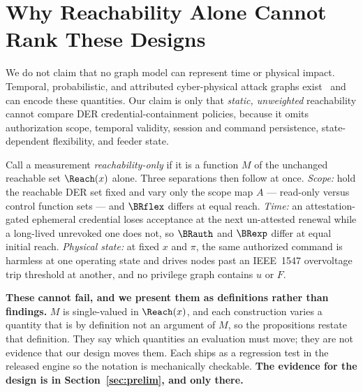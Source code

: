 \section{Why Reachability Alone Cannot Rank These Designs}\label{sec:separation}

We do not claim that no graph model can represent time or physical impact. Temporal,
probabilistic, and attributed cyber-physical attack graphs
exist~\cite{poolsappasit2012dynamic,wang2008attackgraph,frigault2008measuring} and can encode
these quantities. Our claim is only that \emph{static, unweighted} reachability cannot compare DER
credential-containment policies, because it omits authorization scope, temporal validity, session
and command persistence, state-dependent flexibility, and feeder state.

Call a measurement \emph{reachability-only} if it is a function $M$ of the unchanged reachable set
$\Reach(x)$ alone. Three separations then follow at once. \emph{Scope:} hold the reachable DER set
fixed and vary only the scope map $A$ --- read-only versus control function sets --- and $\BRflex$
differs at equal reach. \emph{Time:} an attestation-gated ephemeral credential loses acceptance at
the next un-attested renewal while a long-lived unrevoked one does not, so $\BRauth$ and $\BRexp$
differ at equal initial reach. \emph{Physical state:} at fixed $x$ and $\pi$, the same authorized
command is harmless at one operating state and drives nodes past an IEEE~1547 overvoltage trip
threshold at another, and no privilege graph contains $u$ or $F$.

\textbf{These cannot fail, and we present them as definitions rather than findings.} $M$ is
single-valued in $\Reach(x)$, and each construction varies a quantity that is by definition not an
argument of $M$, so the propositions restate that definition. They say which quantities an
evaluation must move; they are not evidence that our design moves them. Each ships as a regression
test in the released engine so the notation is mechanically checkable. \textbf{The evidence for the
design is in Section~\ref{sec:prelim}, and only there.}

